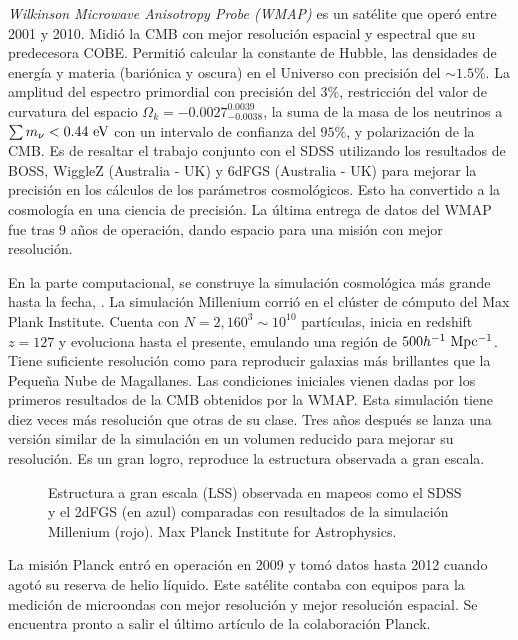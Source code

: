 \documentclass[preprint]{aastex62}
\begin{document}
  \textit{Wilkinson Microwave Anisotropy Probe (WMAP)} es un satélite que operó entre 2001 y 2010.
  Midió la CMB con mejor resolución espacial y espectral que su predecesora COBE. Permitió calcular
  la constante de Hubble, las densidades de energía y materia (bariónica y oscura) en
  el Universo con precisión del $\sim 1.5\%$. La amplitud del espectro primordial con precisión del
  $3\%$, restricción del valor de curvatura del espacio $\Omega_k = -0.0027^{0.0039}_{-0.0038}$, la suma
  de la masa de los neutrinos a $\sum m_\nu < 0.44 \rm~eV$ con un intervalo de confianza del $95\%$,
  y polarización de la CMB. Es de resaltar el trabajo conjunto con el SDSS utilizando los resultados
  de BOSS, WiggleZ (Australia - UK) y 6dFGS (Australia - UK) para mejorar la precisión en los cálculos
  de los parámetros cosmológicos. Esto ha convertido a la cosmología en una ciencia de precisión.
  La última entrega de datos del WMAP fue tras 9 años de operación, dando espacio para una misión con
  mejor resolución. \citep{WMAP2013}

  
  En la parte computacional, se construye la simulación cosmológica más grande hasta la fecha,
  \citep{Springel2005}. La simulación Millenium corrió en el clúster de cómputo del Max Plank Institute.
  Cuenta con $N = 2,160^3\sim 10^{10}$ partículas, inicia en redshift $z=127$ y
  evoluciona hasta el presente, emulando una región de $500 h^{-1} \rm~Mpc^{-1}$. Tiene suficiente
  resolución como para reproducir galaxias más brillantes que la Pequeña Nube de Magallanes. Las
  condiciones iniciales vienen dadas por los primeros resultados de la CMB obtenidos por la WMAP.
  Esta simulación tiene diez veces más resolución que otras de su clase. Tres años después se lanza
  una versión similar de la simulación en un volumen reducido para mejorar su resolución. Es un gran
  logro, reproduce la estructura observada a gran escala.

  \begin{figure}
    \caption{Estructura a gran escala (LSS) observada en mapeos como el SDSS y el 2dFGS (en azul)
      comparadas con resultados de la simulación Millenium (rojo).
      Max Planck Institute for Astrophysics.
      \label{fig:pie_millenium_walls}}
  \end{figure}
  

  La misión Planck entró en operación en 2009 y tomó datos hasta 2012 cuando agotó su reserva de helio
  líquido. Este satélite contaba con equipos para la medición de microondas con mejor resolución y
  mejor resolución espacial. Se encuentra pronto a salir el último artículo de la colaboración Planck.
\end{document}
